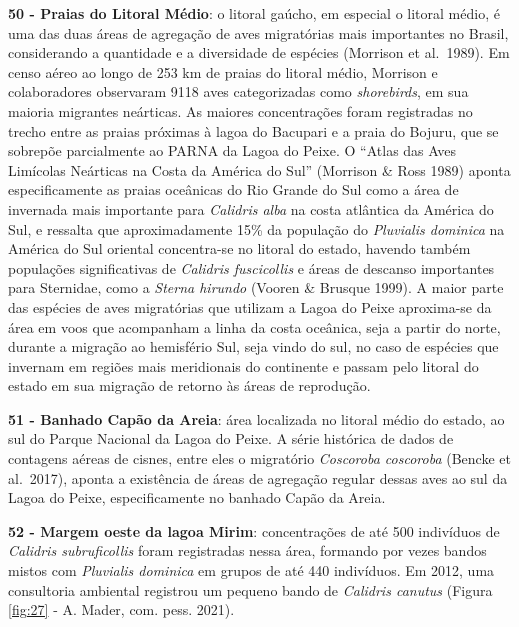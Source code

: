 \documentclass[
  oneside]{scrbook}
\begin{document}
\textbf{50 - Praias do Litoral Médio}: o litoral gaúcho, em especial o litoral médio, é uma das duas áreas de agregação de aves migratórias mais importantes no Brasil, considerando a quantidade e a diversidade de espécies (Morrison et al.~1989). Em censo aéreo ao longo de 253 km de praias do litoral médio, Morrison e colaboradores observaram 9118 aves categorizadas como \emph{shorebirds}, em sua maioria migrantes neárticas. As maiores concentrações foram registradas no trecho entre as praias próximas à lagoa do Bacupari e a praia do Bojuru, que se sobrepõe parcialmente ao PARNA da Lagoa do Peixe. O ``Atlas das Aves Limícolas Neárticas na Costa da América do Sul'' (Morrison \& Ross 1989) aponta especificamente as praias oceânicas do Rio Grande do Sul como a área de invernada mais importante para \emph{Calidris alba} na costa atlântica da América do Sul, e ressalta que aproximadamente 15\% da população do \emph{Pluvialis dominica} na América do Sul oriental concentra-se no litoral do estado, havendo também populações significativas de \emph{Calidris fuscicollis} e áreas de descanso importantes para Sternidae, como a \emph{Sterna hirundo} (Vooren \& Brusque 1999). A maior parte das espécies de aves migratórias que utilizam a Lagoa do Peixe aproxima-se da área em voos que acompanham a linha da costa oceânica, seja a partir do norte, durante a migração ao hemisfério Sul, seja vindo do sul, no caso de espécies que invernam em regiões mais meridionais do continente e passam pelo litoral do estado em sua migração de retorno às áreas de reprodução.

\textbf{51 - Banhado Capão da Areia}: área localizada no litoral médio do estado, ao sul do Parque Nacional da Lagoa do Peixe. A série histórica de dados de contagens aéreas de cisnes, entre eles o migratório \emph{Coscoroba coscoroba} (Bencke et al.~2017), aponta a existência de áreas de agregação regular dessas aves ao sul da Lagoa do Peixe, especificamente no banhado Capão da Areia.

\textbf{52 - Margem oeste da lagoa Mirim}: concentrações de até 500 indivíduos de \emph{Calidris subruficollis} foram registradas nessa área, formando por vezes bandos mistos com \emph{Pluvialis dominica} em grupos de até 440 indivíduos. Em 2012, uma consultoria ambiental registrou um pequeno bando de \emph{Calidris canutus} (Figura \ref{fig:27} - A. Mader, com. pess. 2021).
\end{document}
